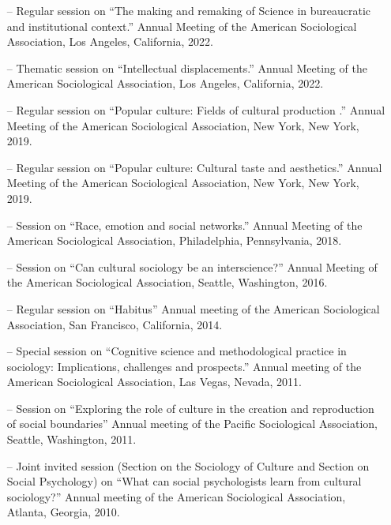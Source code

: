 \begin{itemize}[itemsep=-0.5ex]
    \item[--] Regular session on ``The making and remaking of Science in bureaucratic and institutional context.'' Annual Meeting of the American Sociological Association, Los Angeles, California, 2022.
    
    \item[--] Thematic session on ``Intellectual displacements.'' Annual Meeting of the American Sociological Association, Los Angeles, California, 2022.
    
    \item[--] Regular session on ``Popular culture: Fields of cultural production .'' Annual Meeting of the American Sociological Association, New York, New York, 2019.
    
    \item[--] Regular session on ``Popular culture: Cultural taste and aesthetics.'' Annual Meeting of the American Sociological Association, New York, New York, 2019.
    
    \item[--] Session on ``Race, emotion and social networks.'' Annual Meeting of the American Sociological Association, Philadelphia, Pennsylvania, 2018.
    
    \item[--] Session on  ``Can cultural sociology be an interscience?'' Annual Meeting of the American Sociological Association, Seattle, Washington, 2016.
    
    \item[--] Regular session on ``Habitus''   Annual meeting of the American Sociological Association, San Francisco, California, 2014.
    
    \item[--] Special session on ``Cognitive science and methodological practice in sociology: Implications, challenges and prospects.''  Annual meeting of the American Sociological Association, Las Vegas, Nevada, 2011.
    
    \item[--] Session on ``Exploring the role of culture in the creation and reproduction of social boundaries''   Annual meeting of the Pacific Sociological Association, Seattle, Washington, 2011.
    
    \item[--] Joint invited session (Section on the Sociology of Culture and Section on Social Psychology) on ``What can social psychologists learn from cultural sociology?''   Annual meeting of the American Sociological Association, Atlanta, Georgia, 2010.
    

\end{itemize}
